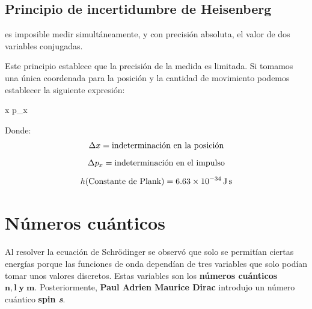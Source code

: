 \subsection{Principio de incertidumbre de Heisenberg}\label{subsec:principio-de-incertidumbre-de-heisenberg}

\begin{principio}
    es imposible medir simultáneamente, y con precisión absoluta, el valor de dos variables conjugadas.
\end{principio}

Este principio establece que la precisión de la medida es limitada.
Si tomamos una única coordenada para la posición y la cantidad de movimiento podemos establecer la siguiente expresión:

\begin{centeredequation}
    \Delta x \cdot \Delta p_x \geq {} \label{eq:heisenberg}
\end{centeredequation}
Donde:
\begin{gather*}
    \Delta x = \text{indeterminación en la posición}\separ
    \Delta p_x = \text{indeterminación en el impulso}\separ
    h ( \text{Constante de Plank}) = \SI{6.63e-34}{\joule\s}
\end{gather*}


\section{Números cuánticos}\label{sec:numeros-cuanticos}

Al resolver la ecuación de Schrödinger se observó que solo se permitían ciertas energías porque las funciones de onda dependían de tres variables que solo podían tomar unos valores discretos.
Estas variables son los \textbf{números cuánticos} $\mathbf{n, l\; y\; m}$.
Posteriormente, \textbf{Paul Adrien Maurice Dirac} introdujo un número cuántico \textbf{spin \textit{s}}.

